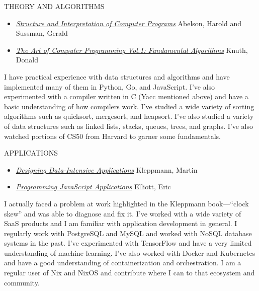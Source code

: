 \documentclass[12pt]{report}
\begin{document}
THEORY AND ALGORITHMS
\begin{itemize}
        \item \href{https://en.wikipedia.org/wiki/Structure_and_Interpretation_of_Computer_Programs}{\emph {Structure and Interpretation of Computer Programs}} Abelson, Harold and Sussman, Gerald
        \item \href{https://www-cs-faculty.stanford.edu/~knuth/taocp.html}{\emph {The Art of Computer Programming Vol.1: Fundamental Algorithms}} Knuth, Donald
\end{itemize}
I have practical experience with data structures and algorithms and have implemented many of them in Python, Go, and JavaScript. I've also experimented  with a compiler written in C (Yacc mentioned above) and have a basic understanding of how compilers work. I've studied a wide variety of sorting algorithms such as quicksort, mergesort, and heapsort. I've also studied a variety of data structures such as linked lists, stacks, queues, trees, and graphs. I've also watched portions of CS50 from Harvard to garner some fundamentals.\hfill \break

APPLICATIONS
\begin{itemize}
        \item \href{https://dataintensive.net/}{\emph {Designing Data-Intensive Applications}} Kleppmann, Martin
        \item \href{https://www.oreilly.com/library/view/programming-javascript-applications/9781491950289/}{\emph {Programming JavaScript Applications}} Elliott, Eric
\end{itemize}
I actually faced a problem at work highlighted in the Kleppmann book---``clock skew'' and was able to diagnose and fix it. I've worked with a wide variety of SaaS products and I am familiar with application development in general.
I regularly work with PostgreSQL and MySQL and worked with NoSQL database systems in the past. I've experimented with TensorFlow and have a very limited understanding of machine learning. I've also worked with Docker and Kubernetes and have a good understanding of containerization and orchestration. I am a regular user of Nix and NixOS and contribute where I can to that ecosystem and community.\hfill \break
\end{document}
